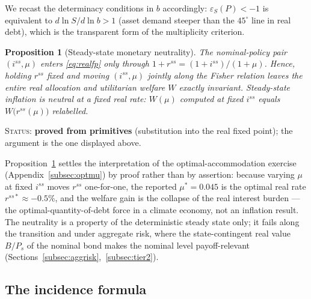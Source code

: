 \documentclass[12pt]{article}
\newtheorem{proposition}{Proposition}
\newcommand{\Sfun}{S}
\begin{document}
We recast the
determinacy conditions in $b$ accordingly: $\varepsilon_S(P)<-1$ is
equivalent to $d\ln\Sfun/d\ln b>1$ (asset demand steeper than the
$45^{\circ}$ line in real debt), which is the transparent form of the
multiplicity criterion.

\begin{proposition}[Steady-state monetary neutrality]\label{prop:muneutral}
The nominal-policy pair $(i^{ss},\mu)$ enters \eqref{eq:realfp} only through
$1+r^{ss}=(1+i^{ss})/(1+\mu)$. Hence, holding $r^{ss}$ fixed and moving
$(i^{ss},\mu)$ jointly along the Fisher relation leaves the entire real
allocation and utilitarian welfare $W$ exactly invariant. Steady-state
inflation is neutral at a fixed real rate: $W(\mu)$ computed at fixed
$i^{ss}$ equals $W\big(r^{ss}(\mu)\big)$ relabelled.
\end{proposition}
\noindent\textsc{Status:} \textbf{proved from primitives} (substitution into the
real fixed point); the argument is the one displayed above.

Proposition~\ref{prop:muneutral} settles the interpretation of the
optimal-accommodation exercise (Appendix~\ref{subsec:optmu}) by proof rather
than by assertion: because varying $\mu$ at fixed $i^{ss}$ moves $r^{ss}$
one-for-one, the reported $\mu^{*}=0.045$ is the optimal real rate
$r^{ss*}\approx-0.5\%$, and the welfare gain is the collapse of the real
interest burden --- the \citet{aiyagarimcgrattan1998} optimal-quantity-of-debt
force in a climate economy, not an inflation result. The neutrality is a
property of the deterministic steady state only; it fails along the
transition and under aggregate risk, where the state-contingent real value
$B/P_s$ of the nominal bond makes the nominal level payoff-relevant
(Sections~\ref{subsec:aggrisk},~\ref{subsec:tier2}).

\subsection{The incidence formula}\label{subsec:suffstat}
\end{document}
